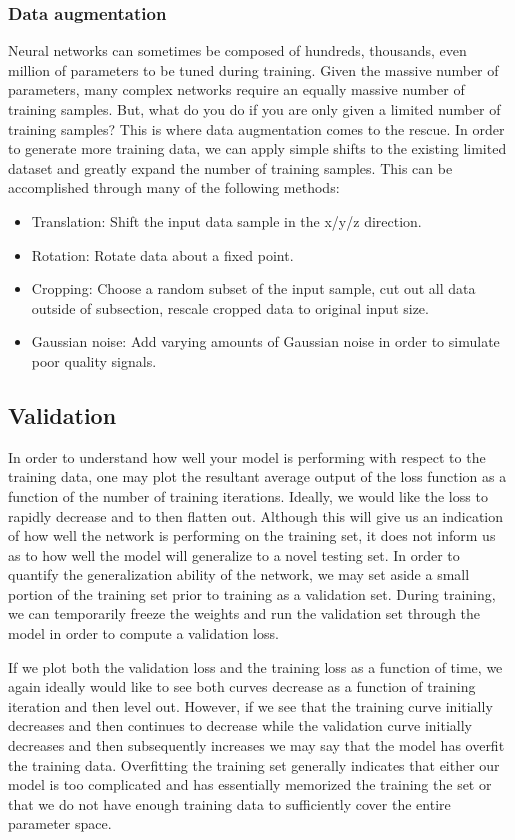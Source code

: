 \subsubsection{Data augmentation}

Neural networks can sometimes be composed of hundreds, thousands, even million of parameters to be tuned during training. Given the massive number of parameters, many complex networks require an equally massive number of training samples. But, what do you do if you are only given a limited number of training samples? This is where data augmentation comes to the rescue. In order to generate more training data, we can apply simple shifts to the existing limited dataset and greatly expand the number of training samples. This can be accomplished through many of the following methods:

\begin{itemize}
    \item Translation: Shift the input data sample in the x/y/z direction.
    \item Rotation: Rotate data about a fixed point.
    \item Cropping: Choose a random subset of the input sample, cut out all data outside of subsection, rescale cropped data to original input size.
    \item Gaussian noise: Add varying amounts of Gaussian noise in order to simulate poor quality signals.
\end{itemize}

%
%
\subsection{Validation}
In order to understand how well your model is performing with respect to the training data, one may plot the resultant average output of the loss function as a function of the number of training iterations. Ideally, we would like the loss to rapidly decrease and to then flatten out. Although this will give us an indication of how well the network is performing on the training set, it does not inform us as to how well the model will generalize to a novel testing set. In order to quantify the generalization ability of the network, we may set aside a small portion of the training set prior to training as a validation set. During training, we can temporarily freeze the weights and run the validation set through the model in order to compute a validation loss. 

If we plot both the validation loss and the training loss as a function of time, we again ideally would like to see both curves decrease as a function of training iteration and then level out. However, if we see that the training curve initially decreases and then continues to decrease while the validation curve initially decreases and then subsequently increases we may say that the model has overfit the training data. Overfitting the training set generally indicates that either our model is too complicated and has essentially memorized the training the set or that we do not have enough training data to sufficiently cover the entire parameter space. 

